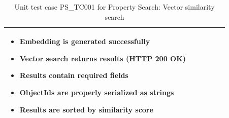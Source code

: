 \begin{table}[H]
{\begin{tabular}{|p{2cm}|p{3cm}|p{3.5cm}|p{4cm}|p{3cm}|p{3.5cm}|}
\begin{minipage}[t]{3.5cm}
\begin{itemize}
    \item Embedding is generated successfully
    \item Vector search returns results (HTTP 200 OK)
    \item Results contain required fields
    \item ObjectIds are properly serialized as strings
    \item Results are sorted by similarity score
\end{itemize}
\end{minipage} \\ \hline
\end{tabular}%
}
\caption{Unit test case PS\_TC001 for Property Search: Vector similarity search}
\label{tab:test_property_search}
\end{table}

